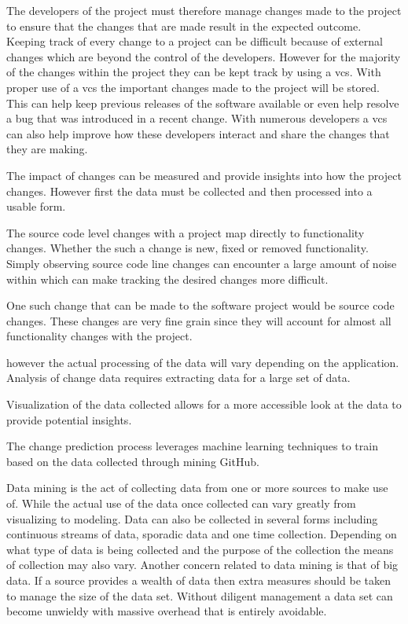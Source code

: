 The developers of the project must therefore manage changes made to the project to ensure that the changes that are made result in the expected outcome. Keeping track of every change to a project can be difficult because of external changes which are beyond the control of the developers. However for the majority of the changes within the project they can be kept track by using a \gls{vcs}. With proper use of a \gls{vcs} the important changes made to the project will be stored. This can help keep previous releases of the software available or even help resolve a bug that was introduced in a recent change. With numerous developers a \gls{vcs} can also help improve how these developers interact and share the changes that they are making.


The impact of changes can be measured and provide insights into how the project changes. However first the data must be collected and then processed into a usable form.

The source code level changes with a project map directly to functionality changes. Whether the such a change is new, fixed or removed functionality. Simply observing source code line changes can encounter a large amount of noise within which can make tracking the desired changes more difficult.

One such change that can be made to the software project would be source code changes. These changes are very fine grain since they will account for almost all functionality changes with the project. 

however the actual processing of the data will vary depending on the application. Analysis of change data requires extracting data for a large set of data.

Visualization of the data collected allows for a more accessible look at the data to provide potential insights.

The change prediction process leverages machine learning techniques to train based on the data collected through mining GitHub.


Data mining is the act of collecting data from one or more sources to make use of. While the actual use of the data once collected can vary greatly from visualizing to modeling. Data can also be collected in several forms including continuous streams of data, sporadic data and one time collection. Depending on what type of data is being collected and the purpose of the collection the means of collection may also vary. Another concern related to data mining is that of big data. If a source provides a wealth of data then extra measures should be taken to manage the size of the data set. Without diligent management a data set can become unwieldy with massive overhead that is entirely avoidable.

